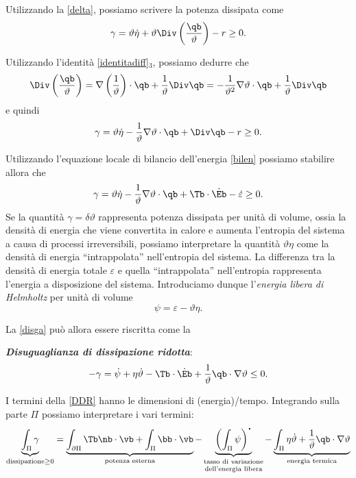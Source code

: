 Utilizzando la \eqref{delta}, possiamo scrivere la potenza dissipata come
\begin{equation}
	\gamma=\vartheta\dot\eta+\vartheta\Div \left( \frac{\qb}{\vartheta} \right)-r\geq 0.
\end{equation}

Utilizzando l'identità \eqref{identitadiff}$_3$, possiamo dedurre che
\begin{equation}
\Div \left( \frac{\qb}{\vartheta} \right)=\nabla\left(\frac{1}{\vartheta}\right)\cdot\qb +\frac{1}{\vartheta}\Div \qb =-\frac{1}{\vartheta^2}\nabla\vartheta\cdot \qb +\frac{1}{\vartheta}\Div \qb 
\end{equation}
 e quindi
 \begin{equation}\label{disga}
	\gamma=\vartheta\dot\eta-\frac{1}{\vartheta}\nabla\vartheta\cdot \qb +\Div \qb -r\geq 0.
 \end{equation}
 
 Utilizzando l'equazione locale di bilancio dell'energia \eqref{bilen} possiamo stabilire allora che
\begin{equation}
	\gamma=\vartheta\dot\eta-\frac{1}{\vartheta}\nabla\vartheta\cdot \qb +\Tb \cdot \dot{\Eb}-\dot{\varepsilon}\geq 0. 
\end{equation}
Se la quantità $\gamma=\delta\vartheta$ rappresenta potenza dissipata per unità di volume, ossia la densità di energia che viene convertita in calore e aumenta l'entropia del sistema a causa di processi irreversibili, possiamo interpretare la quantità $\vartheta\eta$ come la densità di energia  ``intrappolata'' nell'entropia del sistema. 
La differenza tra la densità di energia totale $\varepsilon$ e quella ``intrappolata'' nell'entropia rappresenta l'energia a disposizione del sistema. Introduciamo dunque l'\textit{energia libera di Helmholtz} per unità di volume
\begin{equation}
\psi=\varepsilon-\vartheta\eta.
\end{equation}
 
 La \eqref{disga} può allora essere riscritta come la
 \begin{definition}
\textbf{\textit{Disuguaglianza di dissipazione ridotta}}:
\begin{equation}\label{DDR}
-\gamma=\dot{\psi}+\eta \dot{\vartheta}-\Tb\cdot\dot{\Eb}+\frac{1}{\vartheta}\qb \cdot \nabla \vartheta\leq 0.
\end{equation}
\end{definition} 
I termini della \eqref{DDR} hanno le dimensioni di (energia)/tempo. Integrando sulla parte $\Pi$ possiamo interpretare i vari termini:
\begin{equation}
\underbrace{\int_{\Pi}\gamma}_{{\rm dissipazione}\geq 0}=\underbrace{\int_{\partial \Pi}\Tb \nb \cdot \vb +\int_{\Pi}\bb\cdot \vb}_{{\rm potenza\; esterna}}-
\underbrace{\left(\int_{\Pi}\psi\right)^{\mathop{\vcenter{\hbox{\Large$\cdot$}}}}}_{\scriptsize \shortstack{\text{tasso di variazione} \\ \text{dell'energia libera}}}
-\underbrace{\int_{\Pi}\eta \dot{\vartheta}+\frac{1}{\vartheta}\qb \cdot \nabla\vartheta}_{\text{energia termica}}
\end{equation}

